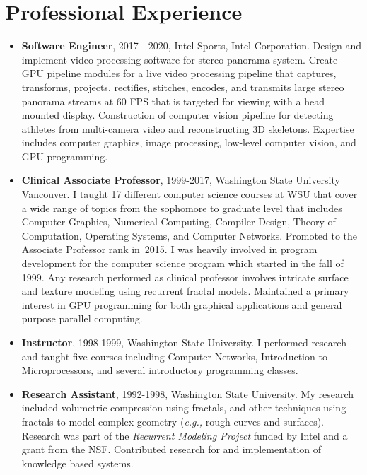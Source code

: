 \documentclass[10pt]{article}
\begin{document}
\section*{Professional Experience}

\begin{itemize}
\item {\bf Software Engineer}, 2017 - 2020,
Intel Sports, Intel Corporation. Design
and implement video processing software for 
stereo panorama system. Create
GPU pipeline modules for a live video processing
pipeline that captures, transforms, projects,
rectifies, stitches, encodes, and transmits
large stereo panorama streams at 60 FPS that is
targeted for viewing
with a head mounted display. 
Construction of computer vision pipeline for detecting
athletes from multi-camera video and reconstructing 3D skeletons.
Expertise
includes computer graphics, image processing,
low-level computer vision, and GPU programming.


\item {\bf Clinical Associate Professor}, 1999-2017,
Washington State University Vancouver.
I taught 17 different computer science courses at WSU that cover a wide
range of topics from the sophomore to graduate level that includes
Computer Graphics, Numerical Computing, Compiler Design, Theory of Computation,
Operating Systems, and Computer Networks.
Promoted
to the Associate Professor rank in~2015.
I was heavily involved in program development for 
the computer science program which started in the fall of 1999.
Any research performed as clinical professor involves intricate surface and texture
modeling using recurrent fractal models. %
Maintained a primary interest in GPU programming for both
graphical applications and general purpose parallel computing.

\item {\bf Instructor}, 1998-1999,
Washington State University. I performed research and taught five
courses including Computer Networks, Introduction to Microprocessors,
and several introductory programming classes.


\item {\bf Research Assistant}, 1992-1998,
Washington State University.
My research included volumetric compression using fractals,
and other techniques using fractals to model complex geometry
({\it e.g.,} rough curves and surfaces). Research was part of the
{\em Recurrent Modeling Project} funded by Intel and a grant
from the NSF.
Contributed research for and implementation of knowledge based systems.


\end{itemize}
\end{document}

